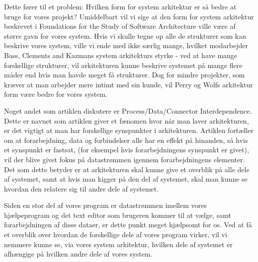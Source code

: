 \documentclass[10pt,a4paper,danish]{article}
\begin{document}
Dette fører til et problem: Hvilken form for system arkitektur er så bedre at bruge for vores projekt? Umiddelbart vil vi sige at den form for system arkitektur beskrevet i Foundations for the Study of Software Architecture ville være af større gavn for vores system. Hvis vi skulle tegne op alle de strukturer som kan beskrive vores system, ville vi ende med ikke særlig mange, hvilket modarbejder Bass, Clements and Kazmans system arkitekturs styrke - ved at have mange forskellige strukturer, vil arkitekturen kunne beskrive systemet på mange flere måder end hvis man havde meget få strukturer. Dog for mindre projekter, som kræver at man arbejder mere intimt med sin kunde, vil Perry og Wolfs arkitektur form være bedre for vores system.

Noget andet som artiklen diskutere er Process/Data/Connector Interdependence. Dette er navnet som artiklen giver et fænomen hvor når man laver arkitekturen, er det vigtigt at man har forskellige synspunkter i arkitekturen. Artiklen fortæller om at forarbejdning, data og forbindelser alle har en effekt på hinanden, så hvis et synspunkt er fastsat, (for eksempel hvis forarbejdningens synspunkt er givet), vil der blive givet fokus på datastrømmen igennem forarbejdningens elementer. Det som dette betyder er at arkitekturen skal kunne give et overblik på alle dele af systemet, samt at hvis man kigger på den del af systemet, skal man kunne se hvordan den relatere sig til andre dele af systemet. 

Siden en stor del af vores program er datastrømmen imellem vores hjælpeprogram og det text editor som brugeren kommer til at vælge, samt forarbejdningen af disse dataer, er dette punkt meget hjælpsomt for os. Ved at få et overblik over hvordan de forskellige dele af vores program virker, vil vi nemmere kunne se, via vores system arkitektur, hvilken dele af systemet er afhængige på hvilken andre dele af vores system.
\end{document}
